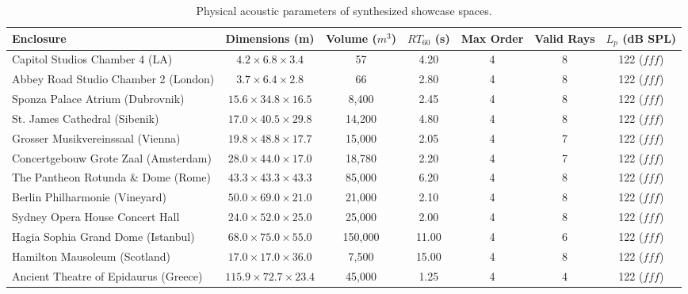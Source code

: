 \documentclass[11pt,a4paper]{article}
\begin{document}
\begin{table}[ht]
\centering
\small
\begin{tabular}{lcccccc}
\toprule
\textbf{Enclosure} & \textbf{Dimensions (m)} & \textbf{Volume ($m^3$)} & $RT_{60}$ \textbf{(s)} & \textbf{Max Order} & \textbf{Valid Rays} & $L_p$ \textbf{(dB SPL)} \\
\midrule
Capitol Studios Chamber 4 (LA) & $4.2 \times 6.8 \times 3.4$ & 57 & 4.20 & 4 & 8 & 122 ($fff$) \\
Abbey Road Studio Chamber 2 (London) & $3.7 \times 6.4 \times 2.8$ & 66 & 2.80 & 4 & 8 & 122 ($fff$) \\
Sponza Palace Atrium (Dubrovnik) & $15.6 \times 34.8 \times 16.5$ & 8,400 & 2.45 & 4 & 8 & 122 ($fff$) \\
St. James Cathedral (Sibenik) & $17.0 \times 40.5 \times 29.8$ & 14,200 & 4.80 & 4 & 8 & 122 ($fff$) \\
Grosser Musikvereinssaal (Vienna) & $19.8 \times 48.8 \times 17.7$ & 15,000 & 2.05 & 4 & 7 & 122 ($fff$) \\
Concertgebouw Grote Zaal (Amsterdam) & $28.0 \times 44.0 \times 17.0$ & 18,780 & 2.20 & 4 & 7 & 122 ($fff$) \\
The Pantheon Rotunda \& Dome (Rome) & $43.3 \times 43.3 \times 43.3$ & 85,000 & 6.20 & 4 & 8 & 122 ($fff$) \\
Berlin Philharmonie (Vineyard) & $50.0 \times 69.0 \times 21.0$ & 21,000 & 2.10 & 4 & 8 & 122 ($fff$) \\
Sydney Opera House Concert Hall & $24.0 \times 52.0 \times 25.0$ & 25,000 & 2.00 & 4 & 8 & 122 ($fff$) \\
Hagia Sophia Grand Dome (Istanbul) & $68.0 \times 75.0 \times 55.0$ & 150,000 & 11.00 & 4 & 6 & 122 ($fff$) \\
Hamilton Mausoleum (Scotland) & $17.0 \times 17.0 \times 36.0$ & 7,500 & 15.00 & 4 & 8 & 122 ($fff$) \\
Ancient Theatre of Epidaurus (Greece) & $115.9 \times 72.7 \times 23.4$ & 45,000 & 1.25 & 4 & 4 & 122 ($fff$) \\
\bottomrule
\end{tabular}
\caption{Physical acoustic parameters of synthesized showcase spaces.}
\end{table}
\end{document}
